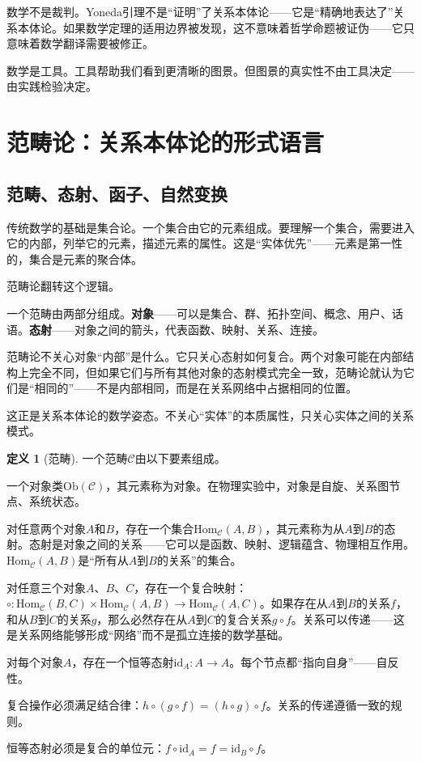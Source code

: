 \documentclass[11pt,a4paper]{book}
\theoremstyle{definition}
\newtheorem{definition}{定义}[chapter]
\begin{document}
数学不是裁判。Yoneda引理不是“证明”了关系本体论——它是“精确地表达了”关系本体论。如果数学定理的适用边界被发现，这不意味着哲学命题被证伪——它只意味着数学翻译需要被修正。

数学是工具。工具帮助我们看到更清晰的图景。但图景的真实性不由工具决定——由实践检验决定。

\section{范畴论：关系本体论的形式语言}

\subsection{范畴、态射、函子、自然变换}

传统数学的基础是集合论。一个集合由它的元素组成。要理解一个集合，需要进入它的内部，列举它的元素，描述元素的属性。这是“实体优先”——元素是第一性的，集合是元素的聚合体。

范畴论翻转这个逻辑。

一个范畴由两部分组成。\textbf{对象}——可以是集合、群、拓扑空间、概念、用户、话语。\textbf{态射}——对象之间的箭头，代表函数、映射、关系、连接。

范畴论不关心对象“内部”是什么。它只关心态射如何复合。两个对象可能在内部结构上完全不同，但如果它们与所有其他对象的态射模式完全一致，范畴论就认为它们是“相同的”——不是内部相同，而是在关系网络中占据相同的位置。

这正是关系本体论的数学姿态。不关心“实体”的本质属性，只关心实体之间的关系模式。

\begin{definition}[范畴]
一个范畴$\mathcal{C}$由以下要素组成。

一个对象类$\text{Ob}(\mathcal{C})$，其元素称为对象。在物理实验中，对象是自旋、关系图节点、系统状态。

对任意两个对象$A$和$B$，存在一个集合$\text{Hom}_{\mathcal{C}}(A,B)$，其元素称为从$A$到$B$的态射。态射是对象之间的关系——它可以是函数、映射、逻辑蕴含、物理相互作用。$\text{Hom}_{\mathcal{C}}(A,B)$是“所有从$A$到$B$的关系”的集合。

对任意三个对象$A$、$B$、$C$，存在一个复合映射：$\circ: \text{Hom}_{\mathcal{C}}(B,C) \times \text{Hom}_{\mathcal{C}}(A,B) \to \text{Hom}_{\mathcal{C}}(A,C)$。如果存在从$A$到$B$的关系$f$，和从$B$到$C$的关系$g$，那么必然存在从$A$到$C$的复合关系$g\circ f$。关系可以传递——这是关系网络能够形成“网络”而不是孤立连接的数学基础。

对每个对象$A$，存在一个恒等态射$\text{id}_A: A \to A$。每个节点都“指向自身”——自反性。

复合操作必须满足结合律：$h\circ(g\circ f) = (h\circ g)\circ f$。关系的传递遵循一致的规则。

恒等态射必须是复合的单位元：$f\circ\text{id}_A = f = \text{id}_B\circ f$。
\end{definition}
\end{document}
